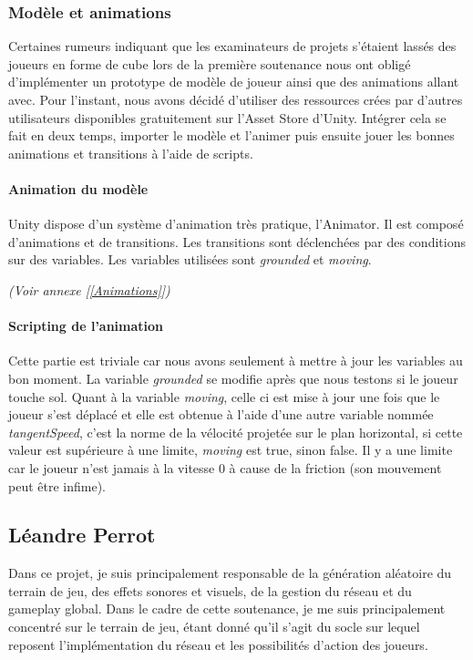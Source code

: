 \documentclass{article}
\begin{document}
\newpage
\subsubsection{Modèle et animations}

Certaines rumeurs indiquant que les examinateurs de projets s'étaient lassés des joueurs en forme de cube lors de la première soutenance nous ont obligé d'implémenter un prototype de modèle de joueur ainsi que des animations allant avec. Pour l'instant, nous avons décidé d'utiliser des ressources crées par d'autres utilisateurs disponibles gratuitement sur l'Asset Store d'Unity. Intégrer cela se fait en deux temps, importer le modèle et l'animer puis ensuite jouer les bonnes animations et transitions à l'aide de scripts.

\paragraph{Animation du modèle}

Unity dispose d'un système d'animation très pratique, l'Animator. Il est composé d'animations et de transitions. Les transitions sont déclenchées par des conditions sur des variables. Les variables utilisées sont \emph{grounded} et \emph{moving}.

\emph{(Voir annexe [\ref{Animations}])}

\paragraph{Scripting de l'animation}

Cette partie est triviale car nous avons seulement à mettre à jour les variables au bon moment. La variable \emph{grounded} se modifie après que nous testons si le joueur touche sol. Quant à la variable \emph{moving}, celle ci est mise à jour une fois que le joueur s'est déplacé et elle est obtenue à l'aide d'une autre variable nommée \emph{tangentSpeed}, c'est la norme de la vélocité projetée sur le plan horizontal, si cette valeur est supérieure à une limite, \emph{moving} est true, sinon false. Il y a une limite car le joueur n'est jamais à la vitesse 0 à cause de la friction (son mouvement peut être infime).

\newpage
\subsection{Léandre Perrot}
Dans ce projet, je suis principalement responsable de la génération aléatoire du terrain de jeu, des effets sonores et visuels, de la gestion du réseau et du gameplay global. Dans le cadre de cette soutenance, je me suis principalement concentré sur le terrain de jeu, étant donné qu'il s'agit du socle sur lequel reposent l'implémentation du réseau et les possibilités d'action des joueurs.
\end{document}
